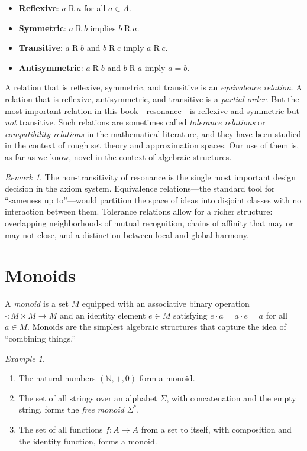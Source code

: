 \documentclass[11pt,openany]{book}
\theoremstyle{definition}
\theoremstyle{plain}
\theoremstyle{remark}
\newtheorem{remark}[axiom]{Remark}
\newtheorem{example}[axiom]{Example}
\begin{document}
\begin{itemize}
\item \textbf{Reflexive}: $a \mathbin{R} a$ for all $a \in A$.
\item \textbf{Symmetric}: $a \mathbin{R} b$ implies $b \mathbin{R} a$.
\item \textbf{Transitive}: $a \mathbin{R} b$ and $b \mathbin{R} c$ imply $a \mathbin{R} c$.
\item \textbf{Antisymmetric}: $a \mathbin{R} b$ and $b \mathbin{R} a$ imply $a = b$.
\end{itemize}

A relation that is reflexive, symmetric, and transitive is an \emph{equivalence relation}. A relation that is reflexive, antisymmetric, and transitive is a \emph{partial order}. But the most important relation in this book---resonance---is reflexive and symmetric but \emph{not} transitive. Such relations are sometimes called \emph{tolerance relations} or \emph{compatibility relations} in the mathematical literature, and they have been studied in the context of rough set theory and approximation spaces. Our use of them is, as far as we know, novel in the context of algebraic structures.

\begin{remark}
The non-transitivity of resonance is the single most important design decision in the axiom system. Equivalence relations---the standard tool for ``sameness up to''---would partition the space of ideas into disjoint classes with no interaction between them. Tolerance relations allow for a richer structure: overlapping neighborhoods of mutual recognition, chains of affinity that may or may not close, and a distinction between local and global harmony.
\end{remark}

\section{Monoids}

A \emph{monoid} is a set $M$ equipped with an associative binary operation $\cdot : M \times M \to M$ and an identity element $e \in M$ satisfying $e \cdot a = a \cdot e = a$ for all $a \in M$. Monoids are the simplest algebraic structures that capture the idea of ``combining things.''

\begin{example}
\begin{enumerate}
\item The natural numbers $(\mathbb{N}, +, 0)$ form a monoid.
\item The set of all strings over an alphabet $\Sigma$, with concatenation and the empty string, forms the \emph{free monoid} $\Sigma^*$.
\item The set of all functions $f : A \to A$ from a set to itself, with composition and the identity function, forms a monoid.
\end{enumerate}
\end{example}
\end{document}
